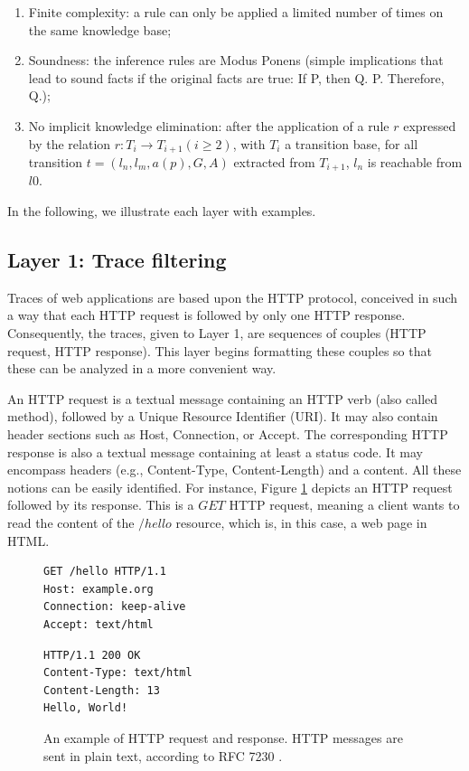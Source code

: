 \begin{enumerate}
\item Finite complexity: a rule can only be applied a limited
number of times on the same knowledge base;

\item Soundness: the inference rules are Modus Ponens (simple
implications that lead to sound facts if the original facts are
true: If P, then Q. P. Therefore, Q.);

\item No implicit knowledge elimination: after the application
of a rule $r$ expressed by the relation $r: T_i \rightarrow
T_{i+1} (i\geq 2)$, with $T_i$ a transition base, for all
transition $t=(l_n,l_m,a(p),G,A)$ extracted from $T_{i+1}$, $l_n$
is reachable from $l0$.
\end{enumerate}

In the following, we illustrate each layer with examples.

\subsection{Layer 1: Trace filtering}
\label{sec:modelinf:webapps:L1}

Traces of web applications are based upon the HTTP protocol,
conceived in such a way that each HTTP request is followed by
only one HTTP response. Consequently, the traces, given to Layer
1, are sequences of couples (HTTP request, HTTP response). This
layer begins formatting these couples so that these can be
analyzed in a more convenient way.

An HTTP request is a textual message containing an HTTP verb
(also called method), followed by a Unique Resource Identifier
(URI). It may also contain header sections such as Host,
Connection, or Accept. The corresponding HTTP response is also a
textual message containing at least a status code. It may
encompass headers (e.g.,  Content-Type, Content-Length) and a
content. All these notions can be easily identified. For
instance, Figure \ref{fig:httpexample} depicts an HTTP request
followed by its response. This is a $GET$ HTTP request, meaning a
client wants to read the content of the $/hello$ resource, which
is, in this case, a web page in HTML.

\begin{figure}[ht]
\begin{framed}
\begin{BVerbatim}
GET /hello HTTP/1.1
Host: example.org
Connection: keep-alive
Accept: text/html
\end{BVerbatim}
\end{framed}

\begin{framed}
\begin{BVerbatim}
HTTP/1.1 200 OK
Content-Type: text/html
Content-Length: 13
Hello, World!
\end{BVerbatim}
\end{framed}

    \caption{An example of HTTP request and response. HTTP messages
    are sent in plain text, according to RFC 7230 \cite{RFC7230}.}
    \label{fig:httpexample}
\end{figure}

